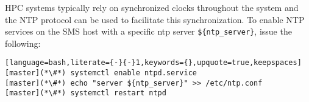 HPC systems typically rely on synchronized clocks throughout the system and the
NTP protocol can be used to facilitate this synchronization.  To enable NTP
services on the SMS host with a specific ntp server \texttt{\$\{ntp\_server\}},
issue the following:

\begin{lstlisting}[language=bash,literate={-}{-}1,keywords={},upquote=true,keepspaces]
[master](*\#*) systemctl enable ntpd.service
[master](*\#*) echo "server ${ntp_server}" >> /etc/ntp.conf
[master](*\#*) systemctl restart ntpd
\end{lstlisting}
